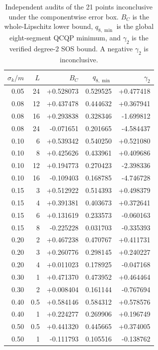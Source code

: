\documentclass[12pt]{iopjournal}
\newenvironment{ruledtabular}{\centering}{}
\newcommand{\colrule}{\hline}
\begin{document}
\begin{table}[!htbp]
\caption{Independent audits of the 21 points inconclusive under the componentwise error box. $B_C$ is the whole-Lipschitz lower bound, $q_{8,\min}$ is the global eight-segment QCQP minimum, and $\gamma_2$ is the verified degree-$2$ SOS bound. A negative $\gamma_2$ is inconclusive.}
\label{tab:qcqp-sos}
\begin{ruledtabular}
\begin{tabular}{rrrrr}
 $\sigma_k/m$ & $L$ & $B_C$ & $q_{8,\min}$ & $\gamma_2$ \\
\colrule
0.05 & 24 & +0.528073 & 0.529525 & +0.477418 \\
0.08 & 12 & +0.437478 & 0.444632 & +0.367941 \\
0.08 & 16 & +0.293838 & 0.328346 & -1.699812 \\
0.08 & 24 & -0.071651 & 0.201665 & -4.584437 \\
0.10 & 6 & +0.539342 & 0.540250 & +0.521080 \\
0.10 & 8 & +0.425626 & 0.433961 & +0.409686 \\
0.10 & 12 & +0.194773 & 0.270423 & -2.398336 \\
0.10 & 16 & -0.109403 & 0.168785 & -4.746728 \\
0.15 & 3 & +0.512922 & 0.514393 & +0.498379 \\
0.15 & 4 & +0.391381 & 0.403673 & +0.372641 \\
0.15 & 6 & +0.131619 & 0.233573 & -0.060163 \\
0.15 & 8 & -0.225228 & 0.031703 & -0.335393 \\
0.20 & 2 & +0.467238 & 0.470767 & +0.411731 \\
0.20 & 3 & +0.260776 & 0.298145 & +0.240227 \\
0.20 & 4 & +0.011023 & 0.178925 & -0.047168 \\
0.30 & 1 & +0.471370 & 0.473952 & +0.464464 \\
0.30 & 2 & +0.008404 & 0.161144 & -0.767694 \\
0.40 & 0.5 & +0.584146 & 0.584312 & +0.578576 \\
0.40 & 1 & +0.224277 & 0.269906 & +0.196749 \\
0.50 & 0.5 & +0.441320 & 0.445665 & +0.374005 \\
0.50 & 1 & -0.111793 & 0.105516 & -0.138762 \\
\end{tabular}
\end{ruledtabular}
\end{table}
\end{document}
